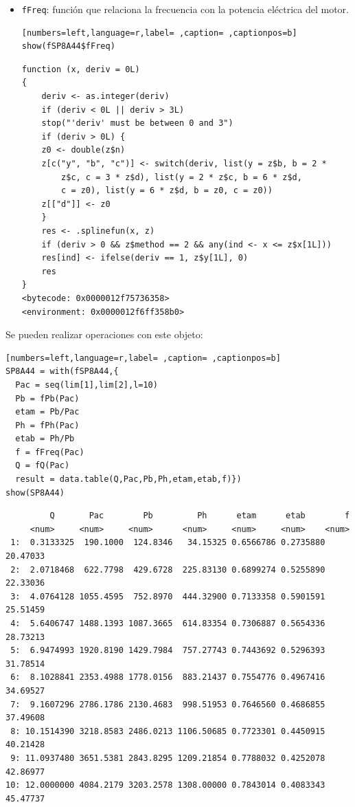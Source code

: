 \begin{itemize}
\begin{itemize}
\item \texttt{fFreq}: función que relaciona la frecuencia con la potencia eléctrica del motor.
\begin{lstlisting}[numbers=left,language=r,label= ,caption= ,captionpos=b]
show(fSP8A44$fFreq)
\end{lstlisting}

\begin{verbatim}
function (x, deriv = 0L) 
{
    deriv <- as.integer(deriv)
    if (deriv < 0L || deriv > 3L) 
	stop("'deriv' must be between 0 and 3")
    if (deriv > 0L) {
	z0 <- double(z$n)
	z[c("y", "b", "c")] <- switch(deriv, list(y = z$b, b = 2 * 
	    z$c, c = 3 * z$d), list(y = 2 * z$c, b = 6 * z$d, 
	    c = z0), list(y = 6 * z$d, b = z0, c = z0))
	z[["d"]] <- z0
    }
    res <- .splinefun(x, z)
    if (deriv > 0 && z$method == 2 && any(ind <- x <= z$x[1L])) 
	res[ind] <- ifelse(deriv == 1, z$y[1L], 0)
    res
}
<bytecode: 0x0000012f75736358>
<environment: 0x0000012f6ff358b0>
\end{verbatim}
\end{itemize}

Se pueden realizar operaciones con este objeto:
\begin{lstlisting}[numbers=left,language=r,label= ,caption= ,captionpos=b]
SP8A44 = with(fSP8A44,{
  Pac = seq(lim[1],lim[2],l=10)
  Pb = fPb(Pac)
  etam = Pb/Pac
  Ph = fPh(Pac)
  etab = Ph/Pb
  f = fFreq(Pac)
  Q = fQ(Pac)
  result = data.table(Q,Pac,Pb,Ph,etam,etab,f)})
show(SP8A44)
\end{lstlisting}

\begin{verbatim}
	     Q       Pac        Pb         Ph      etam      etab        f
	 <num>     <num>     <num>      <num>     <num>     <num>    <num>
 1:  0.3133325  190.1000  124.8346   34.15325 0.6566786 0.2735880 20.47033
 2:  2.0718468  622.7798  429.6728  225.83130 0.6899274 0.5255890 22.33036
 3:  4.0764128 1055.4595  752.8970  444.32900 0.7133358 0.5901591 25.51459
 4:  5.6406747 1488.1393 1087.3665  614.83354 0.7306887 0.5654336 28.73213
 5:  6.9474993 1920.8190 1429.7984  757.27743 0.7443692 0.5296393 31.78514
 6:  8.1028841 2353.4988 1778.0156  883.21437 0.7554776 0.4967416 34.69527
 7:  9.1607296 2786.1786 2130.4683  998.51953 0.7646560 0.4686855 37.49608
 8: 10.1514390 3218.8583 2486.0213 1106.50685 0.7723301 0.4450915 40.21428
 9: 11.0937480 3651.5381 2843.8295 1209.21854 0.7788032 0.4252078 42.86977
10: 12.0000000 4084.2179 3203.2578 1308.00000 0.7843014 0.4083343 45.47737
\end{verbatim}


\end{itemize}
